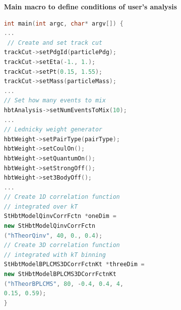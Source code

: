 \documentclass[dvipsnames] {beamer}
\begin{document}
\begin{frame}[fragile]
\begin{columns}[t]
          \begin{block}{\bf \centering \tiny Main macro to define conditions of user's analysis}
            \vskip -0.33cm
                   {\tiny
                     \begin{lstlisting}[language=C++,basicstyle=\tiny\ttfamily,keywordstyle=\color{red}]
int main(int argc, char* argv[]) {
...
 // Create and set track cut
trackCut->setPdgId(particlePdg);
trackCut->setEta(-1., 1.);
trackCut->setPt(0.15, 1.55);
trackCut->setMass(particleMass);
...
// Set how many events to mix
hbtAnalysis->setNumEventsToMix(10);
...
// Lednicky weight generator
hbtWeight->setPairType(pairType);
hbtWeight->setCoulOn();
hbtWeight->setQuantumOn();
hbtWeight->setStrongOff();
hbtWeight->set3BodyOff();
...
// Create 1D correlation function
// integrated over kT
StHbtModelQinvCorrFctn *oneDim =
new StHbtModelQinvCorrFctn
("hTheorQinv", 40, 0., 0.4);
// Create 3D correlation function
// integrated with kT binning
StHbtModelBPLCMS3DCorrFctnKt *threeDim =
new StHbtModelBPLCMS3DCorrFctnKt
("hTheorBPLCMS", 80, -0.4, 0.4, 4,
0.15, 0.59);
}
\end{lstlisting}
}
\end{block}
\end{columns}     
\end{frame}
\end{document}
